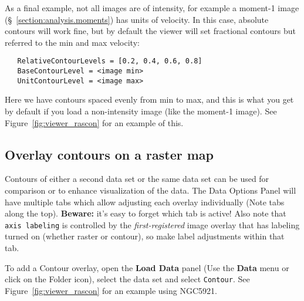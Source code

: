 As a final example, not all images are of intensity, for example a
moment-1 image (\S~\ref{section:analysis.moments}) has units of
velocity.  In this case,
absolute contours will work fine, but by default the viewer will
set fractional contours but referred to the min and max velocity:
\small
\begin{verbatim}
   RelativeContourLevels = [0.2, 0.4, 0.6, 0.8]
   BaseContourLevel = <image min>
   UnitContourLevel = <image max>
\end{verbatim}
\normalsize
Here we have contours spaced evenly from min to max, and this is
what you get by default if you load a non-intensity image (like
the moment-1 image).  See Figure~\ref{fig:viewer_rascon} for an
example of this.

\subsection{Overlay contours on a raster map}
\label{section:display.image.viewcontours}

Contours of either a second data set or the same data set can be used
for comparison or to enhance visualization of the data. The Data Options
Panel will have multiple tabs which allow adjusting each overlay
individually (Note tabs along the top).  {\bf Beware:} it's easy to forget
which tab is active!   Also note that {\tt axis labeling} is controlled
by the {\it first-registered} image overlay that has labeling turned on
(whether raster or contour), so make label adjustments within that tab.

To add a Contour overlay, open the {\bf Load Data} panel (Use the {\bf Data}
menu or click on the Folder icon), select the data set and select {\tt Contour}.
See Figure~\ref{fig:viewer_rascon} for an example using NGC5921.

 

